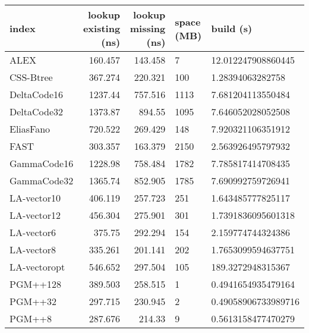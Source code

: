 \begin{tabular}{lrrll}
\hline
 index             &   lookup existing (ns) &   lookup missing (ns) & space (MB)   & build (s)             \\
\hline
 ALEX              &               160.457  &              143.458  & 7            & 12.012247908860445    \\
 CSS-Btree         &               367.274  &              220.321  & 100          & 1.28394063282758      \\
 DeltaCode16       &              1237.44   &              757.516  & 1113         & 7.681204113550484     \\
 DeltaCode32       &              1373.87   &              894.55   & 1095         & 7.646052028052508     \\
 EliasFano         &               720.522  &              269.429  & 148          & 7.920321106351912     \\
 FAST              &               303.357  &              163.379  & 2150         & 2.563926495797932     \\
 GammaCode16       &              1228.98   &              758.484  & 1782         & 7.785817414708435     \\
 GammaCode32       &              1365.74   &              852.905  & 1785         & 7.690992759726941     \\
 LA-vector10       &               406.119  &              257.723  & 251          & 1.643485777825117     \\
 LA-vector12       &               456.304  &              275.901  & 301          & 1.7391836095601318    \\
 LA-vector6        &               375.75   &              292.294  & 154          & 2.159774744324386     \\
 LA-vector8        &               335.261  &              201.141  & 202          & 1.7653099594637751    \\
 LA-vectoropt      &               546.652  &              297.504  & 105          & 189.3272948315367     \\
 PGM++128          &               389.503  &              258.515  & 1            & 0.4941654935479164    \\
 PGM++32           &               297.715  &              230.945  & 2            & 0.49058906733989716   \\
 PGM++8            &               287.676  &              214.33   & 9            & 0.5613158477470279    \\

\end{tabular}

